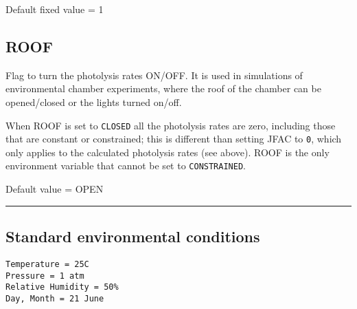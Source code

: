 Default fixed value = 1

\hypertarget{roof}{%
\subsection{ROOF}\label{roof}}

Flag to turn the photolysis rates ON/OFF. It is used in simulations of
environmental chamber experiments, where the roof of the chamber can be
opened/closed or the lights turned on/off.

When ROOF is set to \texttt{CLOSED} all the photolysis rates are zero,
including those that are constant or constrained; this is different than
setting JFAC to \texttt{0}, which only applies to the calculated
photolysis rates (see above). ROOF is the only environment variable that
cannot be set to \texttt{CONSTRAINED}.

Default value = OPEN

\begin{center}\rule{0.5\linewidth}{\linethickness}\end{center}

\hypertarget{standard-environmental-conditions}{%
\subsection{Standard environmental
conditions}\label{standard-environmental-conditions}}

\begin{verbatim}
Temperature = 25C  
Pressure = 1 atm  
Relative Humidity = 50%  
Day, Month = 21 June
\end{verbatim}
